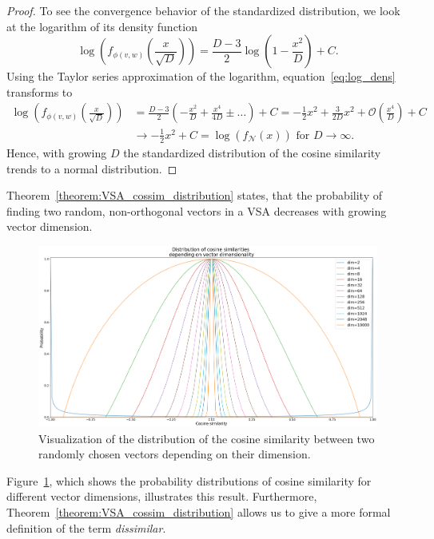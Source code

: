 \begin{proof}
	To see the convergence behavior of the standardized distribution, we look at the logarithm of its density function %
	\begin{equation}
	\label{eq:log_dens}
	\log\left(f_{\phi(v,w)}\left(\frac{x}{\sqrt{D}}\right)\right) = \frac{D-3}{2}\log\left(1-\frac{x^2}{D}\right) + C.
	\end{equation}
	Using the Taylor series approximation of the logarithm, equation~\eqref{eq:log_dens} transforms to
	\begin{align*}
		\log\left(f_{\phi(v,w)}\left(\frac{x}{\sqrt{D}}\right)\right) &= \frac{D-3}{2}\left(-\frac{x^2}{D} + \frac{x^4}{4D} \pm \ldots \right) + C = -\frac{1}{2}x^2 + \frac{3}{2D}x^2 + \mathcal{O}\left(\frac{x^4}{D}\right)  + C  \\
		&\longrightarrow -\frac{1}{2}x^2 + C = \log\left(f_{\mathcal{N}}\left(x\right)\right) \textrm{ for } D \longrightarrow \infty.
	\end{align*}
	Hence, with growing $D$ the standardized distribution of the cosine similarity trends to a normal distribution.
\end{proof}
Theorem~\ref{theorem:VSA_cossim_distribution} states, that the probability of finding two random, non-orthogonal vectors in a \ac{VSA} decreases with growing vector dimension.
\begin{figure}[t]
    \centering
    \includegraphics[width=1.\linewidth]{imgs/distributions_cosine_sims.eps}
    \caption{Visualization of the distribution of the cosine similarity between two randomly chosen vectors depending on their dimension.}
    \label{fig:distributions_cosine_sims}
\end{figure}
Figure~\ref{fig:distributions_cosine_sims}, which shows the probability distributions of cosine similarity for different vector dimensions, illustrates this result.
Furthermore, Theorem~\ref{theorem:VSA_cossim_distribution} allows us to give a more formal definition of the term \emph{dissimilar}.
